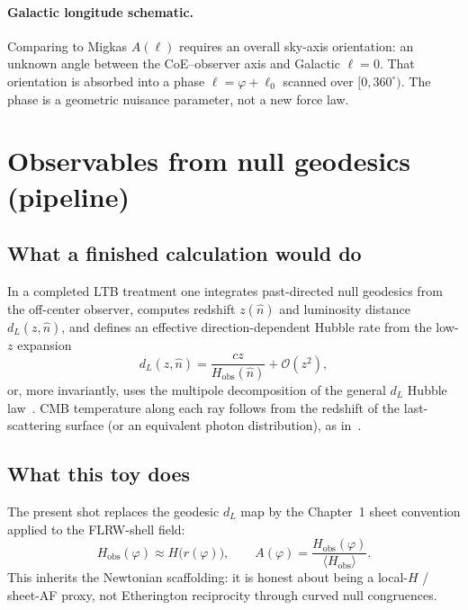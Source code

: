 \documentclass[11pt,a4paper]{article}
\begin{document}
\paragraph{Galactic longitude schematic.}
Comparing to Migkas $A(\ell)$ requires an overall sky-axis orientation: an
unknown angle between the CoE--observer axis and Galactic $\ell=0$. That
orientation is absorbed into a phase $\ell=\varphi+\ell_0$ scanned over
$[0,360^\circ)$. The phase is a geometric nuisance parameter, not a new force
law.

\section{Observables from null geodesics (pipeline)}
\label{sec:obs}

\subsection{What a finished calculation would do}

In a completed LTB treatment one integrates past-directed null geodesics from
the off-center observer, computes redshift $z(\hat n)$ and luminosity distance
$d_L(z,\hat n)$, and defines an effective direction-dependent Hubble rate from
the low-$z$ expansion
\begin{equation}
  d_L(z,\hat n)
  = \frac{cz}{H_{\mathrm{obs}}(\hat n)}
  + \mathcal{O}(z^2),
\end{equation}
or, more invariantly, uses the multipole decomposition of the general $d_L$
Hubble law~\citep{Heinesen2020}. CMB temperature along each ray follows from
the redshift of the last-scattering surface (or an equivalent photon
distribution), as in~\citet{Alnes2006,Kodama2010,Saito2010}.

\subsection{What this toy does}

The present shot replaces the geodesic $d_L$ map by the Chapter~1 sheet
convention applied to the FLRW-shell field:
\begin{equation}
  H_{\mathrm{obs}}(\varphi)
  \approx H\bigl(r(\varphi)\bigr),
  \qquad
  A(\varphi)
  = \frac{H_{\mathrm{obs}}(\varphi)}{\langle H_{\mathrm{obs}}\rangle}.
  \label{eq:toyA}
\end{equation}
This inherits the Newtonian scaffolding: it is honest about being a
local-$H$ / sheet-AF proxy, not Etherington reciprocity through curved null
congruences.
\end{document}
